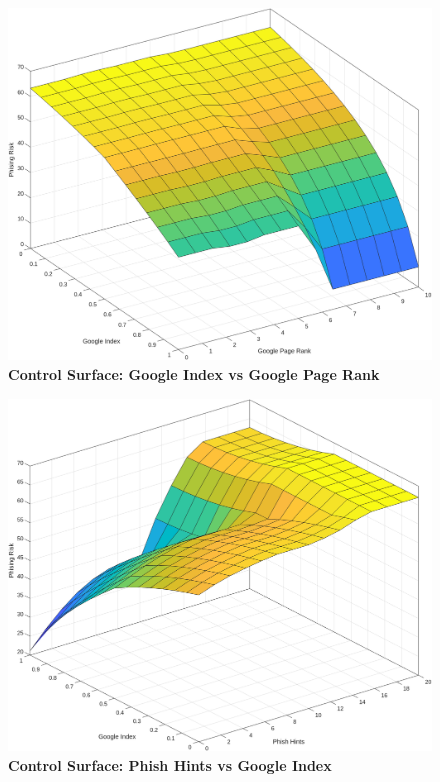 \documentclass[11pt]{article}
\begin{document}
\begin{appendices}
\begin{figure}[H]
    \begin{minipage}{0.45\textwidth}
        \includegraphics[width=\textwidth]{surface_plots/google_index_google_page_rank.png}
        \centering
        \textbf{Control Surface: Google Index vs Google Page Rank}
    \end{minipage}
    \hfill
    \begin{minipage}{0.45\textwidth}
        \includegraphics[width=\textwidth]{surface_plots/phish_hints_google_index.png}
        \centering
        \textbf{Control Surface: Phish Hints vs Google Index}

\end{minipage}
\end{figure}
\end{appendices}
\end{document}
